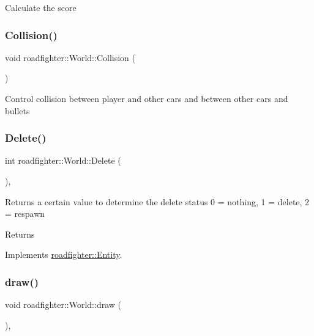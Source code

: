 Calculate the score \mbox{\label{classroadfighter_1_1World_aac79d4ca8afdfe002f050f2db4fc2de5}} 
\subsubsection{\texorpdfstring{Collision()}{Collision()}}
{\footnotesize\ttfamily void roadfighter\+::\+World\+::\+Collision (\begin{DoxyParamCaption}{ }\end{DoxyParamCaption})}

Control collision between player and other cars and between other cars and bullets \mbox{\label{classroadfighter_1_1World_a2db677b750afc0bf4f706f4cd930cb02}} 
\subsubsection{\texorpdfstring{Delete()}{Delete()}}
{\footnotesize\ttfamily int roadfighter\+::\+World\+::\+Delete (\begin{DoxyParamCaption}{ }\end{DoxyParamCaption})\hspace{0.3cm}{\ttfamily [override]}, {\ttfamily [virtual]}}

Returns a certain value to determine the delete status 0 = nothing, 1 = delete, 2 = respawn \begin{DoxyReturn}{Returns}

\end{DoxyReturn}


Implements \hyperlink{classroadfighter_1_1Entity_a08190b0b8e6a3fcdb42273d6096152ac}{roadfighter\+::\+Entity}.

\mbox{\label{classroadfighter_1_1World_a90534263a154d6d7c1e8aef4e0138881}} 
\subsubsection{\texorpdfstring{draw()}{draw()}}
{\footnotesize\ttfamily void roadfighter\+::\+World\+::draw (\begin{DoxyParamCaption}{ }\end{DoxyParamCaption})\hspace{0.3cm}{\ttfamily [override]}, {\ttfamily [virtual]}}


